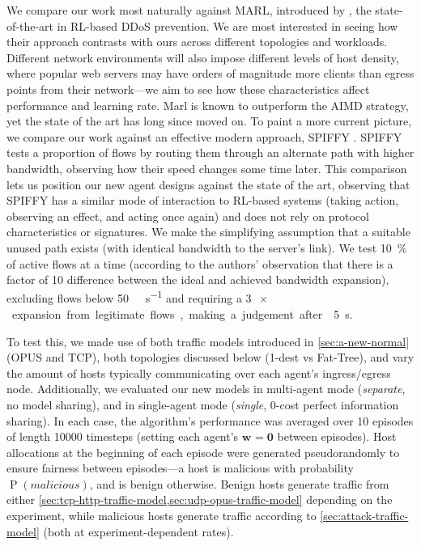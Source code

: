 \documentclass[10pt, times, comsoc]{IEEEtran}
\newcommand{\wvec}[1]{\ensuremath{\bm{w}_{#1}}}
\begin{document}
We compare our work most naturally against MARL, introduced by \textcite{DBLP:journals/eaai/MalialisK15}, the state-of-the-art in RL-based DDoS prevention.
We are most interested in seeing how their approach contrasts with ours across different topologies and workloads.
Different network environments will also impose different levels of host density, where popular web servers may have orders of magnitude more clients than egress points from their network---we aim to see how these characteristics affect performance and learning rate.
\cbstart
{\color{revisiontext}Marl is known to outperform the AIMD \cite{DBLP:journals/ton/YauLLY05} strategy, yet the state of the art has long since moved on.
To paint a more current picture, we compare our work against an effective modern approach, SPIFFY \cite{DBLP:conf/ndss/KangGS16}.
SPIFFY tests a proportion of flows by routing them through an alternate path with higher bandwidth, observing how their speed changes some time later.
This comparison lets us position our new agent designs against the state of the art, observing that SPIFFY has a similar mode of interaction to RL-based systems (taking action, observing an effect, and acting once again) and does not rely on protocol characteristics or signatures.
We make the simplifying assumption that a suitable unused path exists (with identical bandwidth to the server's link).
We test \SI{10}{\percent} of active flows at a time (according to the authors' observation that there is a factor of \num{10} difference between the ideal and achieved bandwidth expansion), excluding flows below \SI{50}{\kilo\bit\per\second} and requiring a \SI{3}{$\! \times$} expansion from legitimate flows, making a judgement after \cbend \SI{5}{\second}.}

To test this, we made use of both traffic models introduced in \cref{sec:a-new-normal} (OPUS and TCP), both topologies discussed below (1-dest vs Fat-Tree), and vary the amount of hosts typically communicating over each agent's ingress/egress node.
Additionally, we evaluated our new models in multi-agent mode (\emph{separate}, no model sharing), and in single-agent mode (\emph{single}, 0-cost perfect information sharing).
In each case, the algorithm's performance was averaged over \num{10} episodes of length \num{10000} timesteps (setting each agent's $\wvec{}=\bm{0}$ between episodes).
Host allocations at the beginning of each episode were generated pseudorandomly to ensure fairness between \cbstart episodes---{\color{revisiontext}a host is malicious with probability $\operatorname{P}(\mathit{malicious})$, and is benign \cbend otherwise.}
Benign hosts generate traffic from either \cref{sec:tcp-http-traffic-model,sec:udp-opus-traffic-model} depending on the experiment, while malicious hosts generate traffic according to \cref{sec:attack-traffic-model} (both at experiment-dependent rates).
\end{document}

